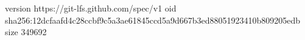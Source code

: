 version https://git-lfs.github.com/spec/v1
oid sha256:12dcfaafd4c28ccbf9c5a3ae61845ccd5a9d667b3ed88051923410b809205edb
size 349692
